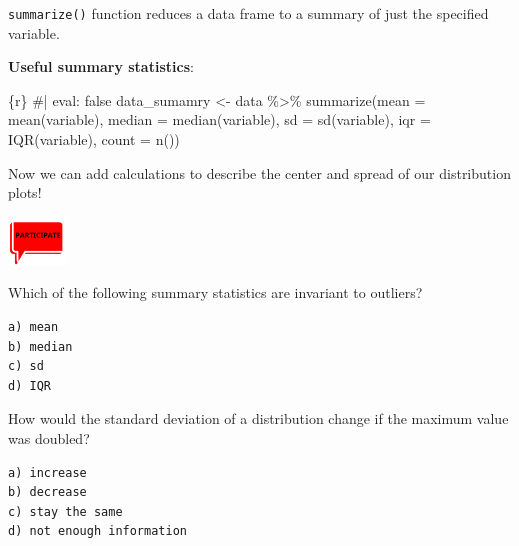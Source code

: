 \documentclass[
  letterpaper,
  DIV=11,
  numbers=noendperiod]{scrreprt}
\newenvironment{Shaded}{\begin{snugshade}}{\end{snugshade}}
\newcommand{\AttributeTok}[1]{\textcolor[rgb]{0.40,0.45,0.13}{#1}}
\newcommand{\CommentTok}[1]{\textcolor[rgb]{0.37,0.37,0.37}{#1}}
\newcommand{\FunctionTok}[1]{\textcolor[rgb]{0.28,0.35,0.67}{#1}}
\newcommand{\InformationTok}[1]{\textcolor[rgb]{0.37,0.37,0.37}{#1}}
\newcommand{\NormalTok}[1]{\textcolor[rgb]{0.00,0.23,0.31}{#1}}
\newcommand{\OtherTok}[1]{\textcolor[rgb]{0.00,0.23,0.31}{#1}}
\newcommand{\SpecialCharTok}[1]{\textcolor[rgb]{0.37,0.37,0.37}{#1}}
\begin{document}
\begin{tcolorbox}[enhanced jigsaw, colframe=quarto-callout-note-color-frame, breakable, colback=white, toprule=.15mm, leftrule=.75mm, left=2mm, opacityback=0, rightrule=.15mm, arc=.35mm, bottomrule=.15mm]
\texttt{summarize()} function reduces a data frame to a summary of just
the specified variable.

\textbf{Useful summary statistics}:

\begin{Shaded}
\begin{Highlighting}[]
\InformationTok{\textasciigrave{}\textasciigrave{}\textasciigrave{}\{r\}}
\CommentTok{\#| eval: false}
\NormalTok{data\_sumamry }\OtherTok{\textless{}{-}}\NormalTok{ data }\SpecialCharTok{\%\textgreater{}\%} 
  \FunctionTok{summarize}\NormalTok{(}\AttributeTok{mean =} \FunctionTok{mean}\NormalTok{(variable),}
            \AttributeTok{median =} \FunctionTok{median}\NormalTok{(variable),}
            \AttributeTok{sd =} \FunctionTok{sd}\NormalTok{(variable),}
            \AttributeTok{iqr =} \FunctionTok{IQR}\NormalTok{(variable),}
            \AttributeTok{count =} \FunctionTok{n}\NormalTok{())}
\InformationTok{\textasciigrave{}\textasciigrave{}\textasciigrave{}}
\end{Highlighting}
\end{Shaded}

Now we can add calculations to describe the center and spread of our
distribution plots!
\end{tcolorbox}

\includegraphics[width=\textwidth,height=0.5in]{images/images_lecture/participate_icon.png}

\begin{tcolorbox}[enhanced jigsaw, colframe=quarto-callout-note-color-frame, breakable, colback=white, toprule=.15mm, leftrule=.75mm, left=2mm, opacityback=0, rightrule=.15mm, arc=.35mm, bottomrule=.15mm]

Which of the following summary statistics are invariant to outliers?

\begin{verbatim}
a) mean     
b) median   
c) sd    
d) IQR
\end{verbatim}

How would the standard deviation of a distribution change if the maximum
value was doubled?

\begin{verbatim}
a) increase
b) decrease
c) stay the same
d) not enough information
\end{verbatim}

\end{tcolorbox}
\end{document}
